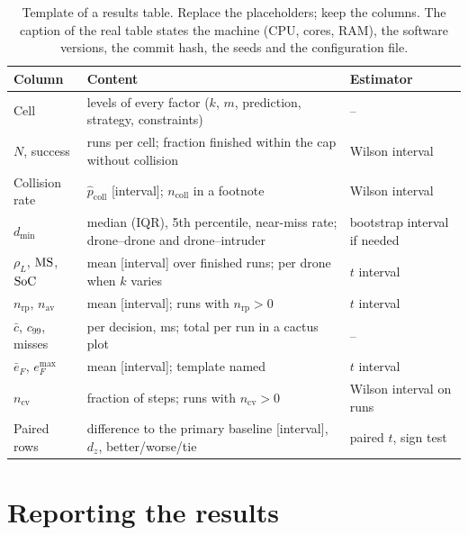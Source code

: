 \begin{table}[tb]
  \centering\small
  \caption{Template of a results table. Replace the placeholders; keep the
  columns. The caption of the real table states the machine (CPU, cores,
  RAM), the software versions, the commit hash, the seeds and the
  configuration file.}
  \label{tab:ch25-template}
  \begin{tabularx}{\textwidth}{@{}lYl@{}}
  \toprule
  Column & Content & Estimator\\
  \midrule
  Cell & levels of every factor ($k$, $m$, prediction, strategy, constraints) & --\\
  $N$, success & runs per cell; fraction finished within the cap without collision & Wilson interval\\
  Collision rate & $\hat p_{\mathrm{coll}}$ [interval]; $n_{\mathrm{coll}}$ in a footnote & Wilson interval\\
  $d_{\min}$ & median (IQR), 5th percentile, near-miss rate; drone--drone and drone--intruder & bootstrap interval if needed\\
  $\rho_L$, $\mathrm{MS}$, $\mathrm{SoC}$ & mean [interval] over finished runs; per drone when $k$ varies & $t$ interval\\
  $n_{\mathrm{rp}}$, $n_{\mathrm{av}}$ & mean [interval]; runs with $n_{\mathrm{rp}} > 0$ & $t$ interval\\
  $\bar c$, $c_{99}$, misses & per decision, ms; total per run in a cactus plot & --\\
  $\bar e_F$, $e_F^{\max}$ & mean [interval]; template named & $t$ interval\\
  $n_{\mathrm{cv}}$ & fraction of steps; runs with $n_{\mathrm{cv}} > 0$ & Wilson interval on runs\\
  Paired rows & difference to the primary baseline [interval], $d_z$, better/worse/tie & paired $t$, sign test\\
  \bottomrule
  \end{tabularx}
\end{table}

\section{Reporting the results}
\label{sec:ch25-reporting}

